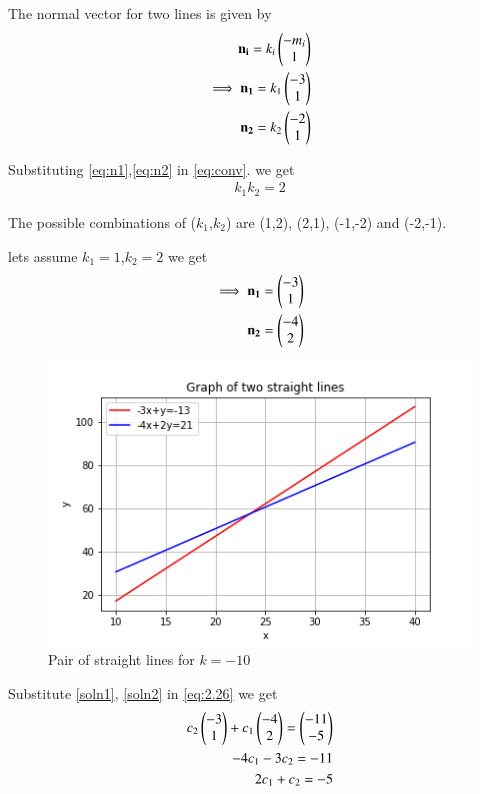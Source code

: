 \documentclass[journal,12pt,twocolumn]{IEEEtran}
\begin{document}
The normal vector for two lines is given by
\begin{align}
    \mathbf{n_i}=k_i\begin{pmatrix}-m_i\\1\end{pmatrix}\label{eq:normvec}\\
    \implies\mathbf{n_1}=k_1\begin{pmatrix}-3\\1\end{pmatrix}\label{eq:n1}\\
    \mathbf{n_2}=k_2\begin{pmatrix}-2\\1\end{pmatrix}\label{eq:n2}
\end{align}

Substituting \eqref{eq:n1},\eqref{eq:n2} in \eqref{eq:conv}. we get
\begin{align}
    k_1k_2=2
\end{align}

The possible combinations of ($k_1$,$k_2$) are (1,2), (2,1), (-1,-2) and (-2,-1).

lets assume $k_1=1$,$k_2=2$ we get
\begin{align}
    \implies\mathbf{n_1}=\begin{pmatrix}-3\\1\end{pmatrix}\label{soln1}\\
    \mathbf{n_2}=\begin{pmatrix}-4\\2\end{pmatrix}\label{soln2}
\end{align}
\begin{figure}[ht!]
    \centering
    \includegraphics[width=\columnwidth]{Figure1}
    \caption{Pair of straight lines for $k=-10$}
    \label{fig:figure1}
\end{figure}

Substitute \eqref{soln1}, \eqref{soln2} in \eqref{eq:2.26} we get 
\begin{align}
    c_2\begin{pmatrix}-3\\1\end{pmatrix}+c_1\begin{pmatrix}-4\\2\end{pmatrix}=\begin{pmatrix} -11\\ -5\end{pmatrix}\\
    -4c_1-3c_2=-11\label{1}\\
    2c_1+c_2=-5\label{2}
\end{align}
\end{document}
